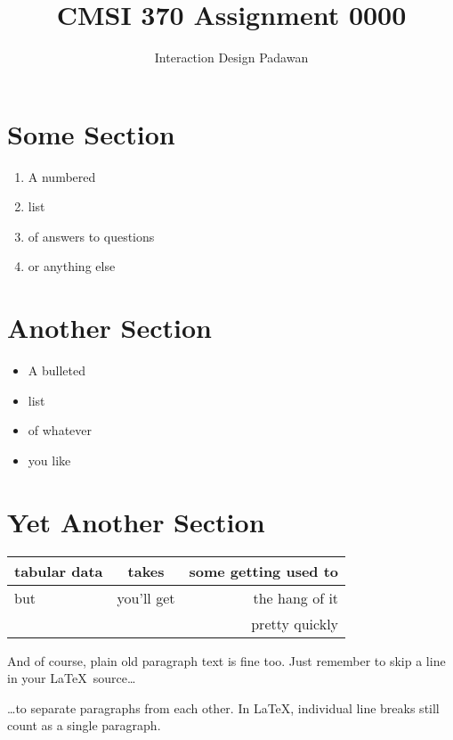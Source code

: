 \documentclass[11pt]{article}
\title{CMSI 370 Assignment 0000}
\author{Interaction Design Padawan}
\begin{document}
\maketitle

\section{Some Section}

\begin{enumerate}
\item A numbered
\item list
\item of answers to questions
\item or anything else
\end{enumerate}

\section{Another Section}

\begin{itemize}
\item A bulleted
\item list
\item of whatever
\item you like
\end{itemize}

\section{Yet Another Section}

\begin{tabular}{|l|c|r|}\hline
tabular data & takes      & some getting used to \\\hline
but          & you'll get & the hang of it \\\hline\hline
             &            & pretty quickly \\\hline
\end{tabular}

And of course, plain old paragraph text is fine too.  Just remember
to skip a line in your \LaTeX\ source\ldots

\ldots to separate paragraphs from each other.  In \LaTeX, individual
line breaks
still
count
as a
single
paragraph.
\end{document}
